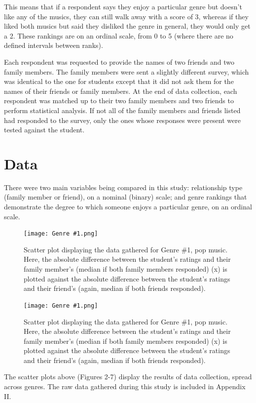 \documentclass[12pt]{report}
\begin{document}
This means that if a respondent says they enjoy a particular genre but doesn't like any of the musics, they can still walk away with a score of 3, whereas if they liked both musics but said they disliked the genre in general, they would only get a 2. These rankings are on an ordinal scale, from 0 to 5 (where there are no defined intervals between ranks).

Each respondent was requested to provide the names of two friends and two family members. The family members were sent a slightly different survey, which was identical to the one for students except that it did not ask them for the names of their friends or family members. At the end of data collection, each respondent was matched up to their two family members and two friends to perform statistical analysis. If not all of the family members and friends listed had responded to the survey, only the ones whose responses were present were tested against the student.

\chapter*{Data}
There were two main variables being compared in this study: relationship type (family member or friend), on a nominal (binary) scale; and genre rankings that demonstrate the degree to which someone enjoys a particular genre, on an ordinal scale.

\begin{figure}[h!]
  \centerline{\texttt{[image: Genre \#1.png]}}
        \caption{\small Scatter plot displaying the data gathered for Genre \#1, pop music. Here, the absolute difference between the student's ratings and their family member's (median if both family members responded) (x) is plotted against the absolute difference between the student's ratings and their friend's (again, median if both friends responded).}

        \centerline{\texttt{[image: Genre \#1.png]}}
        \caption{\small Scatter plot displaying the data gathered for Genre \#1, pop music. Here, the absolute difference between the student's ratings and their family member's (median if both family members responded) (x) is plotted against the absolute difference between the student's ratings and their friend's (again, median if both friends responded).}
\end{figure}

The scatter plots above (Figures 2-7) display the results of data collection, spread across genres. The raw data gathered during this study is included in Appendix II.
\end{document}
